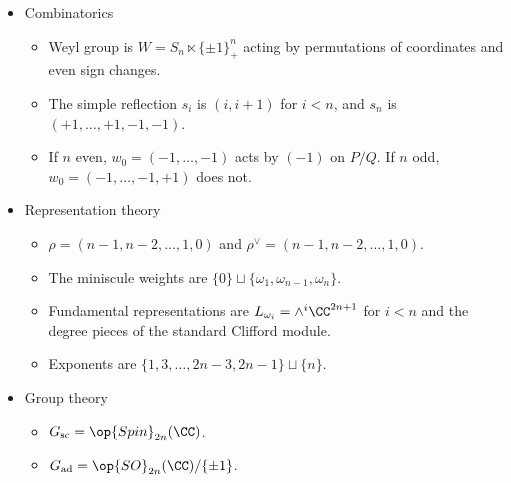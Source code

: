\documentclass{article}
\begin{document}
\begin{itemize}
\begin{itemize}
		\item Dynkin diagram:
		\[\begin{tikzcd}[cramped, row sep=tiny]
			&&&& {\alpha_{n-1}} \\
			{\alpha_1} & {\alpha_2} & \cdots & {\alpha_{n-2}} \\
			&&&& {\alpha_n}
			\arrow[no head, from=2-1, to=2-2]
			\arrow[no head, from=2-2, to=2-3]
			\arrow[no head, from=2-3, to=2-4]
			\arrow[no head, from=2-4, to=1-5]
			\arrow[no head, from=2-4, to=3-5]
		\end{tikzcd}\]
		\item The fundamental weights are $\{\omega_i\}_i$ where $\omega_i\coloneqq({1,\ldots,1},0,\ldots,0)$ has $i$ ones for $i<n-1$ and $\omega_{n-1}\coloneqq\frac12(1,\ldots,1,-1)$ and $\omega_n\coloneqq\frac12(1,\ldots,1)$.
		\item Maximal root $\theta=e_1+e_2$.
	\end{itemize}
	\item Combinatorics
	\begin{itemize}
		\item Weyl group is $W=S_{n}\ltimes\{\pm1\}_+^n$ acting by permutations of coordinates and even sign changes.
		\item The simple reflection $s_i$ is $(i,i+1)$ for $i<n$, and $s_n$ is $(+1,\ldots,+1,-1,-1)$.
		\item If $n$ even, $w_0=(-1,\ldots,-1)$ acts by $(-1)$ on $P/Q$. If $n$ odd, $w_0=(-1,\ldots,-1,+1)$ does not.
	\end{itemize}
	\item Representation theory
	\begin{itemize}
		\item $\rho=(n-1,n-2,\ldots,1,0)$ and $\rho^\lor=(n-1,n-2,\ldots,1,0)$.
		\item The miniscule weights are $\{0\}\sqcup\{\omega_1,\omega_{n-1},\omega_n\}$.
		\item Fundamental representations are $L_{\omega_i}=\land^i\CC^{2n+1}$ for $i<n$ and the degree pieces of the standard Clifford module.
		\item Exponents are $\{1,3,\ldots,2n-3,2n-1\}\sqcup\{n\}$.
	\end{itemize}
	\item Group theory
	\begin{itemize}
		\item $G_{\mathrm{sc}}=\op{Spin}_{2n}(\CC)$.
		\item $G_{\mathrm{ad}}=\op{SO}_{2n}(\CC)/\{\pm1\}$.
	\end{itemize}
\end{itemize}
\end{document}
